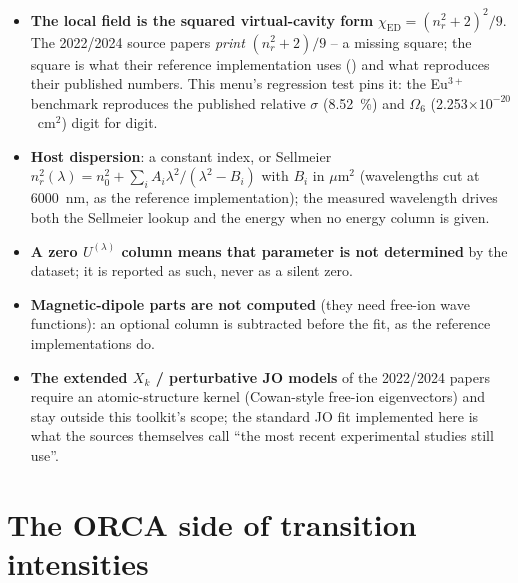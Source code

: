 \begin{readbox}
\begin{itemize}
  \item \textbf{The local field is the squared virtual-cavity form}
    $\chi_{\mathrm{ED}} = (n_r^2+2)^2/9$.  The 2022/2024 source papers
    \emph{print} $(n_r^2+2)/9$ -- a missing square; the square is what
    their reference implementation uses
    () and what reproduces their
    published numbers.  This menu's regression test pins it: the Eu$^{3+}$
    benchmark reproduces the published relative $\sigma$ (8.52~\%) and
    $\Omega_6$ (2.253$\times10^{-20}$~cm$^2$) digit for digit.
  \item \textbf{Host dispersion}: a constant index, or Sellmeier
    $n_r^2(\lambda) = n_0^2 + \sum_i A_i\lambda^2/(\lambda^2 - B_i)$ with
    $B_i$ in $\mu$m$^2$ (wavelengths cut at 6000~nm, as the reference
    implementation); the measured wavelength drives both the Sellmeier
    lookup and the energy when no energy column is given.
  \item \textbf{A zero $U^{(\lambda)}$ column means that parameter is
    not determined} by the dataset; it is reported as such, never as a
    silent zero.
  \item \textbf{Magnetic-dipole parts are not computed} (they need
    free-ion wave functions): an optional  column is
    subtracted before the fit, as the reference implementations do.
  \item \textbf{The extended $X_k$ / perturbative JO models} of the
    2022/2024 papers require an atomic-structure kernel (Cowan-style
    free-ion eigenvectors) and stay outside this toolkit's scope; the
    standard JO fit implemented here is what the sources themselves call
    ``the most recent experimental studies still use''.
\end{itemize}
\end{readbox}

\section{The ORCA side of transition intensities}

